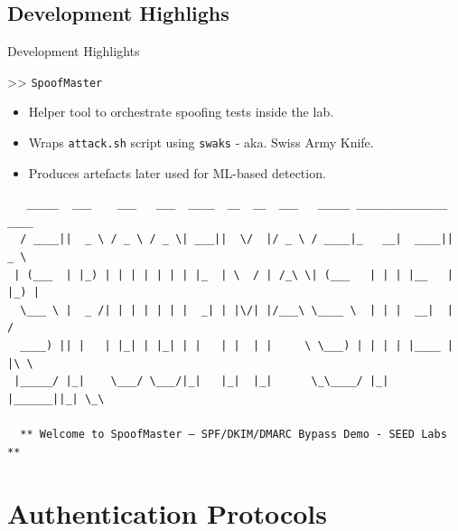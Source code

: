 \documentclass[aspectratio=169,10pt]{beamer}
\begin{document}
\subsection{Development Highlighs}
\begin{frame}[fragile]{Development Highlights}
  \transdissolve
  \begin{block}{>> \texttt{SpoofMaster}}
  	\begin{itemize}
   	 	\item Helper tool to orchestrate spoofing tests inside the lab.
    		\item Wraps \texttt{attack.sh} script using \texttt{swaks} - aka. Swiss Army Knife.
    		\item Produces artefacts later used for ML-based detection.
  	\end{itemize}
  \end{block}
  \vfill
  \begin{verbatim}
   _____  ___    ___   ___  ____  __  __  ___   _____ ______________ ____
  / ____||  _ \ / _ \ / _ \| ___||  \/  |/ _ \ / ____|_   __|  ____||  _ \
 | (___  | |_) | | | | | | | |_  | \  / | /_\ \| (___   | | | |__   | |_) |
  \___ \ |  _ /| | | | | | |  _| | |\/| |/___\ \____ \  | | |  __|  |    /
  ____) || |   | |_| | |_| | |   | |  | |     \ \___) | | | | |____ | |\ \
 |_____/ |_|    \___/ \___/|_|   |_|  |_|      \_\____/ |_| |______||_| \_\

  ** Welcome to SpoofMaster – SPF/DKIM/DMARC Bypass Demo - SEED Labs **  
  \end{verbatim}
\end{frame}

\section{Authentication Protocols}
\end{document}

